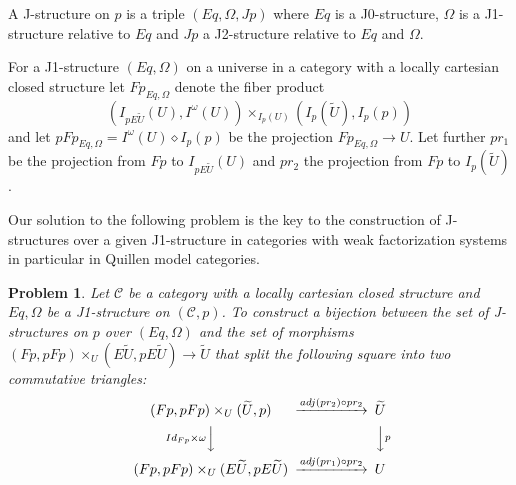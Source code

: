 \documentclass[12pt]{article}
\newenvironment{eq}{\begin{equation}}{\end{equation}}
\newtheorem{problem}[proposition]{Problem}
\newcommand{\llabel}[1]{\label{#1}}
\newcommand{\sr}{\rightarrow}
\newcommand{\wt}{\widetilde}
\newcommand{\dd}{\diamond}
\begin{document}
A J-structure on $p$ is a triple $(Eq,\Omega,Jp)$ where $Eq$ is a J0-structure, $\Omega$ is a J1-structure relative to $Eq$ and $Jp$ a J2-structure relative to $Eq$ and $\Omega$.

For a J1-structure $(Eq,\Omega)$ on a universe in a category with a locally cartesian closed structure let $Fp_{Eq,\Omega}$ denote the fiber product
%
$$(I_{pE\wt{U}}(U), I^{\omega}(U)) \times_{I_p(U)} (I_p(\wt{U}), I_p(p))$$
%
and let $pFp_{Eq,\Omega}=I^{\omega}(U)\dd I_p(p)$ be the projection $Fp_{Eq,\Omega}\sr U$. Let further $pr_1$ be the projection from $Fp$ to $I_{pE\wt{U}}(U)$ and $pr_2$ the projection from $Fp$ to $I_p(\wt{U})$.

Our solution to the following problem is the key to the construction of J-structures over a given J1-structure in categories with weak factorization systems in particular in Quillen model categories. 
%
\begin{problem}
\llabel{2015.05.12.l1}
Let $\mathcal C$ be a category with a locally cartesian closed structure and $Eq,\Omega$ be a J1-structure on $({\mathcal C},p)$. To construct a bijection 
between the set of J-structures on $p$ over $(Eq,\Omega)$ and the set of morphisms $(Fp,pFp)\times_U(E\wt{U},pE\wt{U})\sr \wt{U}$ that split the following square into two commutative triangles:
%
\begin{eq}\llabel{2015.05.22.sq1}
\begin{CD}
(Fp,pFp)\times_U(\wt{U},p) @>adj(pr_2)\circ pr_2>> \wt{U}\\
@VId_{Fp}\times \omega VV @VV p V\\
(Fp,pFp)\times_U(E\wt{U},pE\wt{U}) @>adj(pr_1)\circ pr_2>> U
\end{CD}
\end{eq}
%
\end{problem}
%
\end{document}
